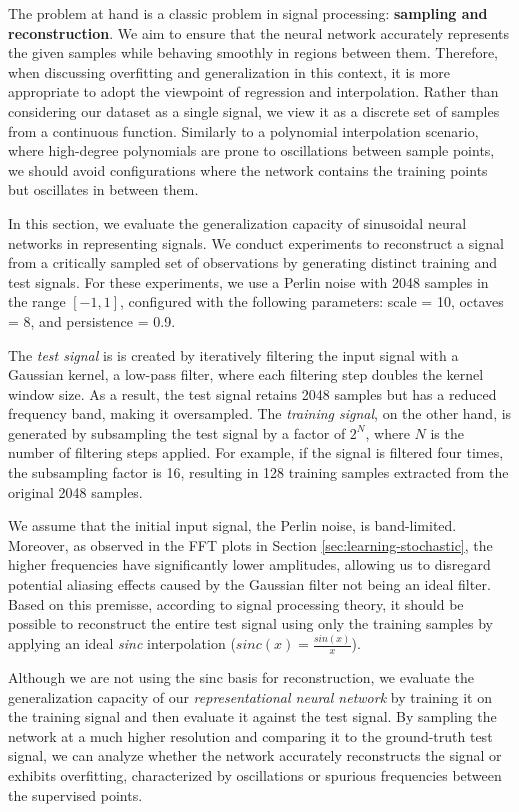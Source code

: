 The problem at hand is a classic problem in signal processing: \textbf{sampling and reconstruction}. We aim to ensure that the neural network accurately represents the given samples while behaving smoothly in regions between them. Therefore, when discussing overfitting and generalization in this context, it is more appropriate to adopt the viewpoint of regression and interpolation. Rather than considering our dataset as a single signal, we view it as a discrete set of samples from a continuous function. Similarly to a polynomial interpolation scenario, where high-degree polynomials are prone to oscillations between sample points, we should avoid configurations where the network contains the training points but oscillates in between them.

In this section, we evaluate the generalization capacity of sinusoidal neural networks in representing signals. We conduct experiments to reconstruct a signal from a critically sampled set of observations by generating distinct training and test signals. For these experiments, we use a Perlin noise with 2048 samples in the range $[-1, 1]$, configured with the following parameters: scale = 10, octaves = 8, and persistence = 0.9.

The \textit{test signal} is is created by iteratively filtering the input signal with a Gaussian kernel, a low-pass filter, where each filtering step doubles the kernel window size. As a result, the test signal retains 2048 samples but has a reduced frequency band, making it oversampled. The \textit{training signal}, on the other hand, is generated by subsampling the test signal by a factor of $2^N$, where \(N\) is the number of filtering steps applied. For example, if the signal is filtered four times, the subsampling factor is 16, resulting in 128 training samples extracted from the original 2048 samples.

We assume that the initial input signal, the Perlin noise, is band-limited. Moreover, as observed in the FFT plots in Section \ref{sec:learning-stochastic}, the higher frequencies have significantly lower amplitudes, allowing us to disregard potential aliasing effects caused by the Gaussian filter not being an ideal filter. Based on this premisse, according to signal processing theory, it should be possible to reconstruct the entire test signal using only the training samples by applying an ideal \textit{sinc} interpolation ($sinc(x) = \frac{sin(x)}{x}$). 

Although we are not using the sinc basis for reconstruction, we evaluate the generalization capacity of our \textit{representational neural network} by training it on the training signal and then evaluate it against the test signal. By sampling the network at a much higher resolution and comparing it to the ground-truth test signal, we can analyze whether the network accurately reconstructs the signal or exhibits overfitting, characterized by oscillations or spurious frequencies between the supervised points.

